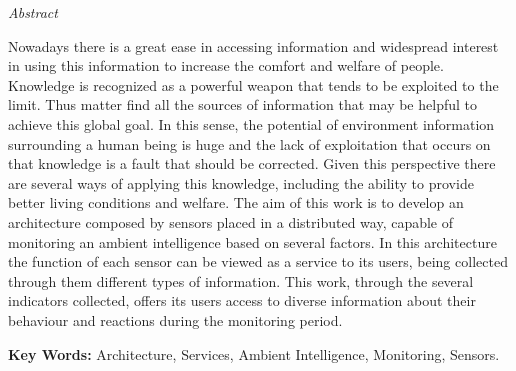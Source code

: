 \begin{center}
{\large \textit{Abstract} }
\end{center}







\vspace{0.5cm}
\quad Nowadays there is a great ease in accessing information and widespread interest in using  this information to increase the comfort and welfare of people. Knowledge is recognized as a powerful weapon that tends to be exploited to the limit. Thus matter find all the sources of information that may be helpful to achieve this global goal. In this sense, the potential of environment information surrounding a human being is huge and the lack of exploitation that occurs on that knowledge is a fault that should be corrected. Given this perspective there are several ways of applying this knowledge, including the ability to provide better living conditions and welfare. The aim of this work is to develop an architecture composed by sensors placed in a distributed way, capable of monitoring an ambient intelligence based on several factors. In this architecture the function of each sensor can be viewed as a service to its users, being collected through them different types of information. This work, through the several indicators collected, offers its users access to diverse information about their behaviour and reactions during  the monitoring period.
\vspace{3cm}

\textbf{Key Words:} Architecture, Services, Ambient Intelligence, Monitoring, Sensors.